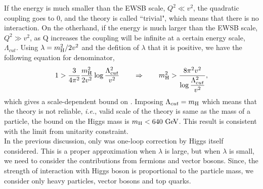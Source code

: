 If the energy is much smaller than the EWSB scale, $Q^2\ll v^2$, 
the quadratic coupling goes to 0, and the theory is called 
``trivial", which means that there is no interaction. 
On the otherhand, if the energy is much larger than the EWSB scale, $Q^2\gg v^2$,
as Q increases the coupling will be infinite at a certain energy scale, $\Lambda_{cut}$. 
Using $\lambda = m_{\mathrm{H}}^2/2v^2$ and the defition of $\lambda$ that it is positive, 
we have the following equation for denominator,
\begin{eqnarray} 
1 > \frac{3}{4\pi^2} \frac{m_{\mathrm{H}}^2}{2v^2} \log{\frac{\Lambda_{cut}^2}{v^2}} 
\qquad \Rightarrow  \qquad 
m_{\mathrm{H}}^2 > \frac{8\pi^2v^2}{\log{\displaystyle  \frac{\Lambda_{cut}^2}{v^2}}},
\end{eqnarray} 
which gives a scale-dependent bound on \mHi. Imposing $\Lambda_{cut} = m_{\mathrm{H}}$ 
which means that the theory is not reliable, \textit{i.e.}, valid scale of the theory is same 
as the mass of a particle, the bound on the Higgs mass is $m_{\mathrm{H}} < 640~\mathrm{Ge\kern -0.1em V}$. 
This result is consistent with the limit from unitarity constraint. 
\\

In the previous discussion, only was one-loop correction by Higgs itself considered.
This is a proper approximation when $\lambda$ is large, but
when $\lambda$ is small, we need to consider the contributions from fermions 
and vector bosons. Since, the strength of interaction with Higgs boson is proportional 
to the particle mass, we consider only heavy particles, vector bosons and top quarks.   

